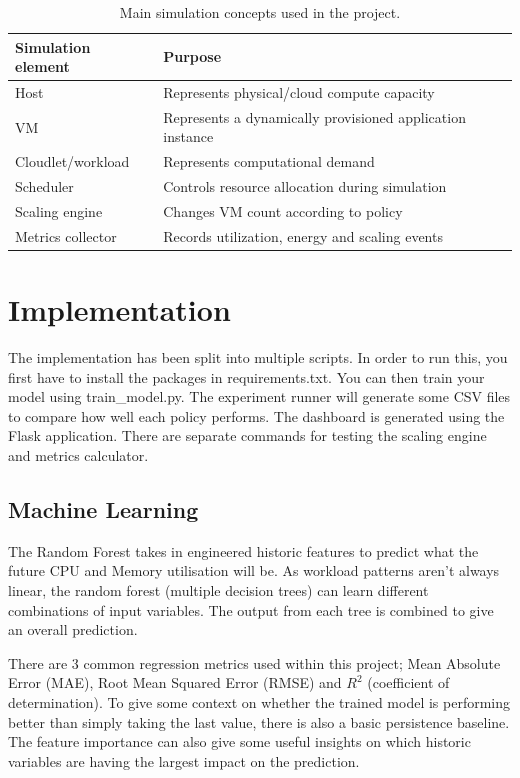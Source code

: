 \documentclass[10pt,journal,compsoc]{IEEEtran}
\begin{document}
\begin{table}[htbp]
\caption{Main simulation concepts used in the project.}
\centering
\begin{tabular}{|p{3cm}|p{4.8cm}|}
\hline
\textbf{Simulation element} & \textbf{Purpose} \\ \hline
Host & Represents physical/cloud compute capacity \\ \hline
VM & Represents a dynamically provisioned application instance \\ \hline
Cloudlet/workload & Represents computational demand \\ \hline
Scheduler & Controls resource allocation during simulation \\ \hline
Scaling engine & Changes VM count according to policy \\ \hline
Metrics collector & Records utilization, energy and scaling events \\ \hline
\end{tabular}
\label{tab:simulation}
\end{table}

\section{Implementation}
The implementation has been split into multiple scripts. In order to run this, you first have to install the packages in requirements.txt. You can then train your model using train\_model.py. The experiment runner will generate some CSV files to compare how well each policy performs. The dashboard is generated using the Flask application. There are separate commands for testing the scaling engine and metrics calculator.

\subsection{Machine Learning}
The Random Forest takes in engineered historic features to predict what the future CPU and Memory utilisation will be. As workload patterns aren't always linear, the random forest (multiple decision trees) can learn different combinations of input variables. The output from each tree is combined to give an overall prediction.

There are 3 common regression metrics used within this project; Mean Absolute Error (MAE), Root Mean Squared Error (RMSE) and $R^2$ (coefficient of determination). To give some context on whether the trained model is performing better than simply taking the last value, there is also a basic persistence baseline. The feature importance can also give some useful insights on which historic variables are having the largest impact on the prediction.
\end{document}
